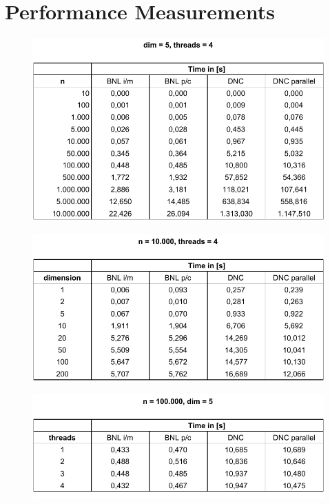 \chapter{Performance Measurements} \label{appendix-performance}

\begin{figure}[h]
	\centering
	\includegraphics[width=0.9\linewidth]{figures/table-non-progressive-n}
	\label{fig:table-non-progressive-n}
\end{figure}

\begin{figure}[H]
	\centering
	\includegraphics[width=0.9\linewidth]{figures/table-non-progressive-dim}
	\label{fig:table-non-progressive-dim}
\end{figure}

\begin{figure}[h]
	\centering
	\includegraphics[width=0.9\linewidth]{figures/table-non-progressive-threads}
	\label{fig:table-non-progressive-threads}
\end{figure}

